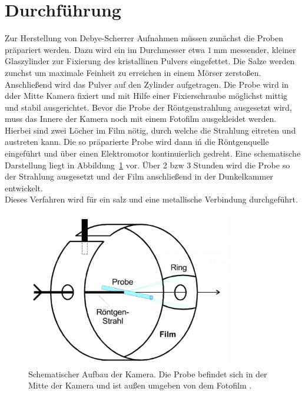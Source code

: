 \section{Durchführung}
\label{sec:durchführung}

Zur Herstellung von Debye-Scherrer Aufnahmen müssen zunächst die Proben präpariert werden. Dazu wird ein im Durchmesser
etwa $\SI{1}{\milli\meter}$ messender, kleiner Glaszylinder zur Fixierung des kristallinen Pulvers eingefettet.
Die Salze werden zunchst um maximale Feinheit zu erreichen in einem Mörser zerstoßen. Anschließend wird das Pulver
auf den Zylinder aufgetragen. Die Probe wird in dder Mitte Kamera fixiert und mit Hilfe einer Fixierschraube möglichst
mittig und stabil ausgerichtet. Bevor die Probe der Röntgenstrahlung ausgesetzt wird, muss das Innere der Kamera
noch mit einem Fotofilm ausgekleidet werden. Hierbei sind zwei Löcher im Film nötig, durch welche die Strahlung
eitreten und austreten kann. Die so präparierte Probe wird dann iń die Röntgenquelle eingeführt und über einen
Elektromotor kontinuierlich gedreht. Eine schematische Darstellung liegt in Abbildung~\ref{fig:aufbau} vor.
Über 2 bzw 3 Stunden wird die Probe so der Strahlung ausgesetzt und der Film anschließend in der Dunkelkammer entwickelt. \\
Dieses Verfahren wird für ein salz und eine metallische Verbindung durchgeführt.
%
\begin{figure}[htb]
  \centering
  \includegraphics[width=0.8\textwidth]{figures/plot_aufbau.pdf}
  \caption{Schematischer Aufbau der Kamera. Die Probe befindet sich in der Mitte der Kamera und ist außen umgeben von dem Fotofilm \cite{V41}.}
  \label{fig:aufbau}
\end{figure}
%

